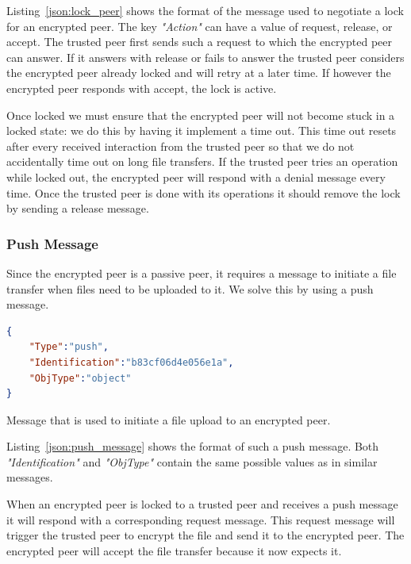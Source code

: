 Listing~\ref{json:lock_peer} shows the format of the message used to negotiate a lock for an encrypted peer.
The key \textit{"Action"} can have a value of request, release, or accept.
The trusted peer first sends such a request to which the encrypted peer can answer.
If it answers with release or fails to answer the trusted peer considers the encrypted peer already locked and will retry at a later time.
If however the encrypted peer responds with accept, the lock is active.

Once locked we must ensure that the encrypted peer will not become stuck in a locked state: we do this by having it implement a time out.
This time out resets after every received interaction from the trusted peer so that we do not accidentally time out on long file transfers.
If the trusted peer tries an operation while locked out, the encrypted peer will respond with a denial message every time.
Once the trusted peer is done with its operations it should remove the lock by sending a release message.

\subsubsection{Push Message}
\label{subs:Push Message}

Since the encrypted peer is a passive peer, it requires a message to initiate a file transfer when files need to be uploaded to it.
We solve this by using a push message.

\begin{listing}[htp]
    \begin{lstlisting}[language=json,firstnumber=0]
{
    "Type":"push",
    "Identification":"b83cf06d4e056e1a",
    "ObjType":"object"
}
    \end{lstlisting}
\caption[Push Message]{Message that is used to initiate a file upload to an encrypted peer.}
\label{json:push_message}
\end{listing}

Listing~\ref{json:push_message} shows the format of such a push message.
Both \textit{"Identification"} and \textit{"ObjType"} contain the same possible values as in similar messages.

When an encrypted peer is locked to a trusted peer and receives a push message it will respond with a corresponding request message.
This request message will trigger the trusted peer to encrypt the file and send it to the encrypted peer.
The encrypted peer will accept the file transfer because it now expects it.

